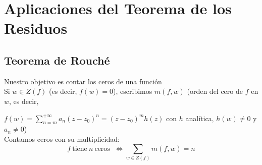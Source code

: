 \documentclass{report}
\begin{document}
    \section{Aplicaciones del Teorema de los Residuos}
      \subsection{Teorema de Rouché}
        Nuestro objetivo es contar los ceros de una función\\
        
        Si $w\in Z(f)$ (es decir, $f(w)=0$), escribimos $m(f,w)$ (orden del cero de $f$ en $w$, es decir, 

        $f(w)=\displaystyle\sum_{n=m}^{+\infty}a_n(z-z_0)^n=(z-z_0)^m h(z)$\hspace{0.6cm} con $h$ analítica, $h(w)\neq 0$ y $a_n\neq 0$)\\

        Contamos ceros con su multiplicidad:\\
        \[f\ \text{tiene}\ n\ \text{ceros }\ \Longleftrightarrow \sum_{w\in Z(f)}m(f,w)=n\]
        
\end{document}
